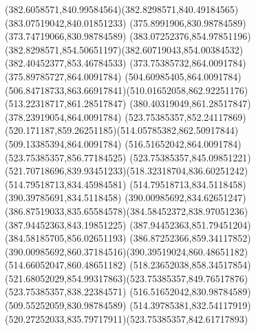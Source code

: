 {{\curveto(382.6058571,840.99584564)(382.8298571,840.49184565)(383.07519042,840.01851233)
\lineto(375.8991906,830.98784589)
\lineto(373.74719066,830.98784589)
\closepath
\moveto(383.07252376,854.97851196)
\curveto(382.8298571,854.50651197)(382.60719043,854.00384532)(382.40452377,853.46784533)
\lineto(373.75385732,864.0091784)
\lineto(375.89785727,864.0091784)
\closepath
\moveto(504.60985405,864.0091784)
\curveto(506.84718733,863.66917841)(510.01652058,862.92251176)(513.22318717,861.28517847)
\lineto(380.40319049,861.28517847)
\lineto(378.23919054,864.0091784)
\closepath
\moveto(523.75385357,852.24117869)
\curveto(520.171187,859.26251185)(514.05785382,862.50917844)(509.13385394,864.0091784)
\lineto(516.51652042,864.0091784)
\lineto(523.75385357,856.77184525)
\closepath
\moveto(523.75385357,845.09851221)
\curveto(521.70718696,839.93451233)(518.32318704,836.60251242)(514.79518713,834.45984581)
\lineto(514.79518713,834.5118458)
\lineto(390.39785691,834.5118458)
\curveto(390.00985692,834.62651247)(386.87519033,835.65584578)(384.58452372,838.97051236)
\lineto(387.94452363,843.19851225)
\lineto(387.94452363,851.79451204)
\lineto(384.58185705,856.02651193)
\curveto(386.87252366,859.34117852)(390.00985692,860.37184516)(390.39519024,860.48651182)
\lineto(514.66052047,860.48651182)
\curveto(518.23652038,858.34517854)(521.68052029,854.99317863)(523.75385357,849.76517876)
\closepath
\moveto(523.75385357,838.22384571)
\lineto(516.51652042,830.98784589)
\lineto(509.55252059,830.98784589)
\curveto(514.39785381,832.54117919)(520.27252033,835.79717911)(523.75385357,842.61717893)
\closepath
}
}
{
}
{
}
